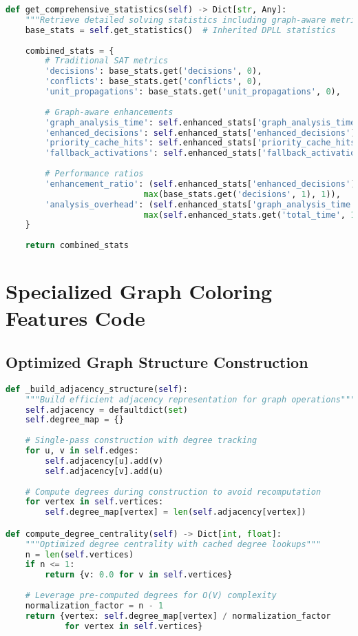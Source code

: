 \begin{lstlisting}[language=Python, caption=Enhanced Performance Monitoring]
def get_comprehensive_statistics(self) -> Dict[str, Any]:
    """Retrieve detailed solving statistics including graph-aware metrics"""
    base_stats = self.get_statistics()  # Inherited DPLL statistics
    
    combined_stats = {
        # Traditional SAT metrics
        'decisions': base_stats.get('decisions', 0),
        'conflicts': base_stats.get('conflicts', 0),
        'unit_propagations': base_stats.get('unit_propagations', 0),
        
        # Graph-aware enhancements
        'graph_analysis_time': self.enhanced_stats['graph_analysis_time'],
        'enhanced_decisions': self.enhanced_stats['enhanced_decisions'],
        'priority_cache_hits': self.enhanced_stats['priority_cache_hits'],
        'fallback_activations': self.enhanced_stats['fallback_activations'],
        
        # Performance ratios
        'enhancement_ratio': (self.enhanced_stats['enhanced_decisions'] / 
                            max(base_stats.get('decisions', 1), 1)),
        'analysis_overhead': (self.enhanced_stats['graph_analysis_time'] / 
                            max(self.enhanced_stats.get('total_time', 1), 1))
    }
    
    return combined_stats
\end{lstlisting}

\section{Specialized Graph Coloring Features Code}

\subsection{Optimized Graph Structure Construction}
\label{appendix:graph-structure}

\begin{lstlisting}[language=Python, caption=Optimized Graph Structure Construction]
def _build_adjacency_structure(self):
    """Build efficient adjacency representation for graph operations"""
    self.adjacency = defaultdict(set)
    self.degree_map = {}
    
    # Single-pass construction with degree tracking
    for u, v in self.edges:
        self.adjacency[u].add(v)
        self.adjacency[v].add(u)
        
    # Compute degrees during construction to avoid recomputation
    for vertex in self.vertices:
        self.degree_map[vertex] = len(self.adjacency[vertex])

def compute_degree_centrality(self) -> Dict[int, float]:
    """Optimized degree centrality with cached degree lookups"""
    n = len(self.vertices)
    if n <= 1:
        return {v: 0.0 for v in self.vertices}
    
    # Leverage pre-computed degrees for O(V) complexity
    normalization_factor = n - 1
    return {vertex: self.degree_map[vertex] / normalization_factor 
            for vertex in self.vertices}
\end{lstlisting}

